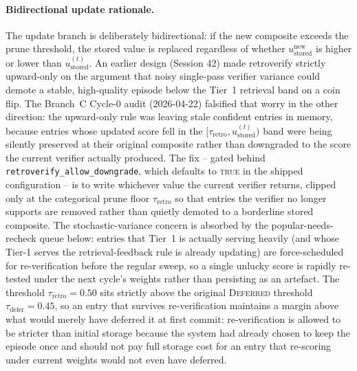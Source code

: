 \paragraph{Bidirectional update rationale.}
The update branch is deliberately bidirectional: if the new composite exceeds the prune threshold, the stored value is replaced regardless of whether $u_{\text{stored}}^{\text{new}}$ is higher or lower than $u_{\text{stored}}^{(t)}$. An earlier design (Session 42) made retroverify strictly upward-only on the argument that noisy single-pass verifier variance could demote a stable, high-quality episode below the Tier~1 retrieval band on a coin flip. The Branch~C Cycle-0 audit (2026-04-22) falsified that worry in the other direction: the upward-only rule was leaving stale confident entries in memory, because entries whose updated score fell in the $[\tau_{\text{retro}}, u_{\text{stored}}^{(t)})$ band were being silently preserved at their original composite rather than downgraded to the score the current verifier actually produced. The fix -- gated behind \texttt{retroverify\_allow\_downgrade}, which defaults to \textsc{true} in the shipped configuration -- is to write whichever value the current verifier returns, clipped only at the categorical prune floor $\tau_{\text{retro}}$ so that entries the verifier no longer supports are removed rather than quietly demoted to a borderline stored composite. The stochastic-variance concern is absorbed by the popular-needs-recheck queue below: entries that Tier~1 is actually serving heavily (and whose Tier-1 serves the retrieval-feedback rule is already updating) are force-scheduled for re-verification before the regular sweep, so a single unlucky score is rapidly re-tested under the next cycle's weights rather than persisting as an artefact. The threshold $\tau_{\text{retro}} = 0.50$ sits strictly above the original \textsc{Deferred} threshold $\tau_{\text{defer}} = 0.45$, so an entry that survives re-verification maintains a margin above what would merely have deferred it at first commit: re-verification is allowed to be stricter than initial storage because the system had already chosen to keep the episode once and should not pay full storage cost for an entry that re-scoring under current weights would not even have deferred.

